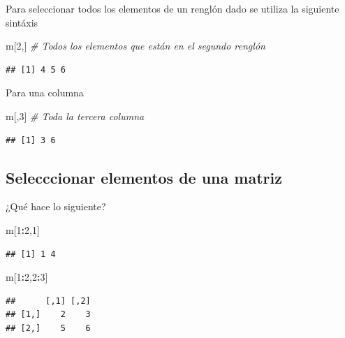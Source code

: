 \documentclass[
]{book}
\newenvironment{Shaded}{\begin{snugshade}}{\end{snugshade}}
\newcommand{\CommentTok}[1]{\textcolor[rgb]{0.56,0.35,0.01}{\textit{#1}}}
\newcommand{\DecValTok}[1]{\textcolor[rgb]{0.00,0.00,0.81}{#1}}
\newcommand{\NormalTok}[1]{#1}
\newcommand{\SpecialCharTok}[1]{\textcolor[rgb]{0.81,0.36,0.00}{\textbf{#1}}}
\begin{document}
Para seleccionar todos los elementos de un renglón dado se utiliza la siguiente sintáxis

\begin{Shaded}
\begin{Highlighting}[]
\NormalTok{m[}\DecValTok{2}\NormalTok{,]  }\CommentTok{\# Todos los elementos que están en el segundo renglón}
\end{Highlighting}
\end{Shaded}

\begin{verbatim}
## [1] 4 5 6
\end{verbatim}

Para una columna

\begin{Shaded}
\begin{Highlighting}[]
\NormalTok{m[,}\DecValTok{3}\NormalTok{] }\CommentTok{\# Toda la tercera columna}
\end{Highlighting}
\end{Shaded}

\begin{verbatim}
## [1] 3 6
\end{verbatim}

\subsection{Selecccionar elementos de una matriz}\label{selecccionar-elementos-de-una-matriz}

¿Qué hace lo siguiente?

\begin{Shaded}
\begin{Highlighting}[]
\NormalTok{m[}\DecValTok{1}\SpecialCharTok{:}\DecValTok{2}\NormalTok{,}\DecValTok{1}\NormalTok{]}
\end{Highlighting}
\end{Shaded}

\begin{verbatim}
## [1] 1 4
\end{verbatim}

\begin{Shaded}
\begin{Highlighting}[]
\NormalTok{m[}\DecValTok{1}\SpecialCharTok{:}\DecValTok{2}\NormalTok{,}\DecValTok{2}\SpecialCharTok{:}\DecValTok{3}\NormalTok{]}
\end{Highlighting}
\end{Shaded}

\begin{verbatim}
##      [,1] [,2]
## [1,]    2    3
## [2,]    5    6
\end{verbatim}
\end{document}
